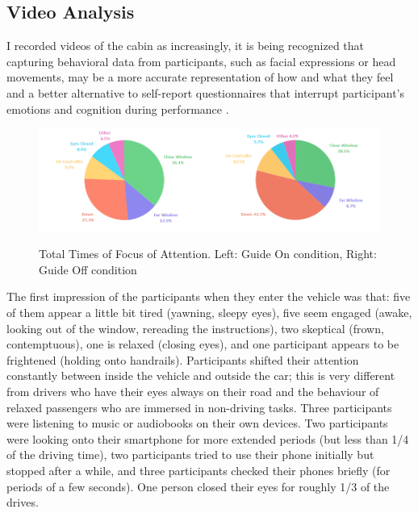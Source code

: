 \subsection{Video Analysis}
\label{sec:videoAnalysis}
I recorded videos of the cabin as increasingly, it is being recognized that capturing behavioral data from participants, such as facial expressions or head movements, may be a more accurate representation of how and what they feel and a better alternative to self-report questionnaires that interrupt participant’s emotions and cognition during performance \citep[see][]{Ahn2011UsingPrediction}.

\begin{figure}
    \includegraphics[width=0.5\textwidth]{fig/PieTotal.png}\includegraphics[width=0.5\textwidth]{fig/PieTotalNo.png}
    \caption[Total Times of Focus of Attention]{Total Times of Focus of Attention. Left: Guide On condition, Right: Guide Off condition}
    \label{fig:totalPie}
\end{figure}

The first impression of the participants when they enter the vehicle was that: five of them appear a little bit tired (yawning, sleepy eyes), five seem engaged (awake, looking out of the window, rereading the instructions), two skeptical (frown, contemptuous), one is relaxed (closing eyes), and one participant appears to be frightened (holding onto handrails). Participants shifted their attention constantly between inside the vehicle and outside the car; this is very different from drivers who have their eyes always on their road and the behaviour of relaxed passengers who are immersed in non-driving tasks. 
Three participants were listening to music or audiobooks on their own devices. Two participants were looking onto their smartphone for more extended periods (but less than 1/4 of the driving time), two participants tried to use their phone initially but stopped after a while, and three participants checked their phones briefly (for periods of a few seconds). One person closed their eyes for roughly 1/3 of the drives. 

